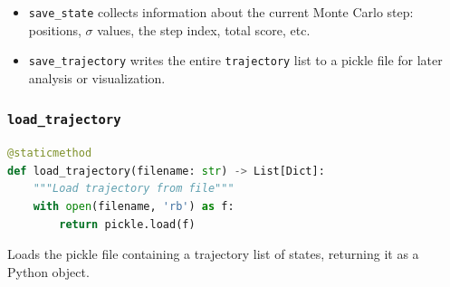 \documentclass[12pt]{article}
\begin{document}
\begin{itemize}
    \item \texttt{save\_state} collects information about the current Monte Carlo step: positions, $\sigma$ values, the step index, total score, etc.
    \item \texttt{save\_trajectory} writes the entire \texttt{trajectory} list to a pickle file for later analysis or visualization.
\end{itemize}

\subsubsection{\texttt{load\_trajectory}}
\begin{lstlisting}[language=Python]
@staticmethod
def load_trajectory(filename: str) -> List[Dict]:
    """Load trajectory from file"""
    with open(filename, 'rb') as f:
        return pickle.load(f)
\end{lstlisting}
\noindent
Loads the pickle file containing a trajectory list of states, returning it as a Python object.
\end{document}
